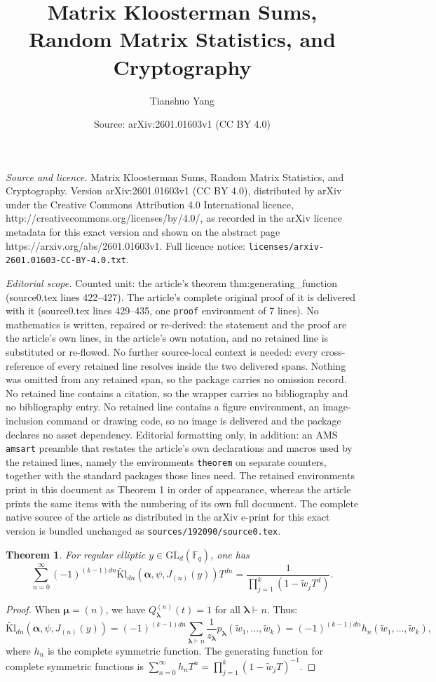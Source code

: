 \documentclass[10pt,a4paper]{amsart}
\title{Matrix Kloosterman Sums, Random Matrix Statistics, and Cryptography}
\author{Tianshuo Yang}
\date{Source: arXiv:2601.01603v1 (CC BY 4.0)}
\newtheorem{theorem}{Theorem}
\newcommand{\Fq}{\mathbb{F}_q}
\newcommand{\GL}{\mathrm{GL}}
\newcommand{\tKl}{\widetilde{\mathrm{Kl}}}
\begin{document}
\maketitle

\noindent\emph{Source and licence.} Matrix Kloosterman Sums, Random Matrix Statistics, and Cryptography. Version arXiv:2601.01603v1 (CC BY 4.0), distributed by arXiv under the Creative Commons Attribution 4.0 International licence, http://creativecommons.org/licenses/by/4.0/, as recorded in the arXiv licence metadata for this exact version and shown on the abstract page https://arxiv.org/abs/2601.01603v1. Full licence notice: \texttt{licenses/arxiv-2601.01603-CC-BY-4.0.txt}.\par\smallskip

\noindent\textit{Editorial scope.} Counted unit: the article's theorem thm:generating\_function (source0.tex lines 422--427). The article's complete original proof of it is delivered with it (source0.tex lines 429--435, one \texttt{proof} environment of 7 lines). No mathematics is written, repaired or re-derived: the statement and the proof are the article's own lines, in the article's own notation, and no retained line is substituted or re-flowed.  No further source-local context is needed: every cross-reference of every retained line resolves inside the two delivered spans.  Nothing was omitted from any retained span, so the package carries no omission record.  No retained line contains a citation, so the wrapper carries no bibliography and no bibliography entry.  No retained line contains a figure environment, an image-inclusion command or drawing code, so no image is delivered and the package declares no asset dependency.  Editorial formatting only, in addition: an AMS \texttt{amsart} preamble that restates the article's own declarations and macros used by the retained lines, namely the environments \texttt{theorem} on separate counters, together with the standard packages those lines need.  The retained environments print in this document as Theorem 1 in order of appearance, whereas the article prints the same items with the numbering of its own full document.  The complete native source of the article as distributed in the arXiv e-print for this exact version is bundled unchanged as \texttt{sources/192090/source0.tex}.
\begin{theorem} For regular elliptic $y \in \GL_d(\Fq)$, one has
\label{thm:generating_function}
\[
\sum_{n=0}^\infty (-1)^{(k-1)dn} \tKl_{dn}(\bm{\alpha}, \psi, J_{(n)}(y)) T^{dn} = \frac{1}{\prod_{j=1}^k (1 - \widetilde{w}_j T^d)}.
\]
\end{theorem}

\begin{proof}
When $\bm{\mu} = (n)$, we have $Q_{\bm{\lambda}}^{(n)}(t) = 1$ for all $\bm{\lambda} \vdash n$. Thus:
\[
\tKl_{dn}(\bm{\alpha}, \psi, J_{(n)}(y)) = (-1)^{(k-1)dn} \sum_{\bm{\lambda} \vdash n} \frac{1}{z_{\bm{\lambda}}} p_{\bm{\lambda}}(\widetilde{w}_1, \ldots, \widetilde{w}_k) = (-1)^{(k-1)dn} h_n(\widetilde{w}_1, \ldots, \widetilde{w}_k),
\]
where $h_n$ is the complete symmetric function. The generating function for complete symmetric functions is $\sum_{n=0}^\infty h_n T^n = \prod_{j=1}^k (1 - \widetilde{w}_j T)^{-1}$.
\end{proof}
\end{document}

